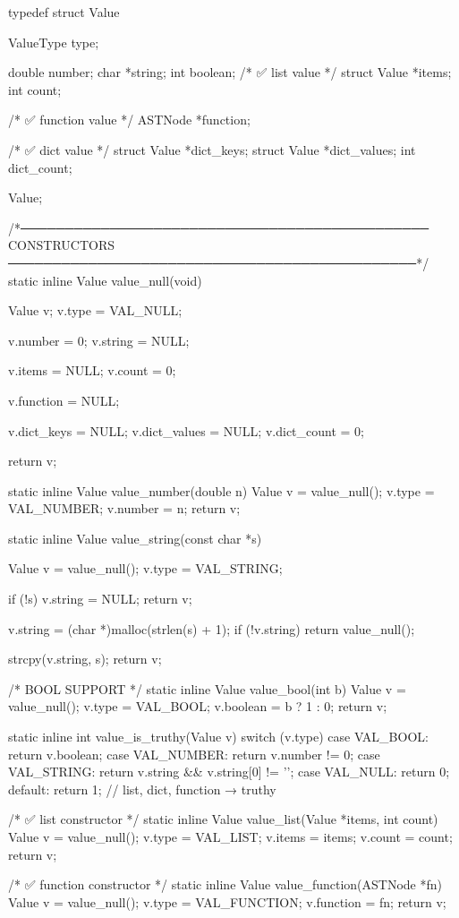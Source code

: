 \documentclass{article}
\begin{document}
typedef struct Value {
    ValueType type;

    double number;
    char *string;
    int boolean;
    /* ✅ list value */
    struct Value *items;
    int count;

    /* ✅ function value */
    ASTNode *function;

    /* ✅ dict value */
    struct Value *dict_keys;
    struct Value *dict_values;
    int dict_count;

} Value;

/*──────────────────────────────────────────────
  CONSTRUCTORS
──────────────────────────────────────────────*/
static inline Value value_null(void)
{
    Value v;
    v.type = VAL_NULL;

    v.number = 0;
    v.string = NULL;

    v.items = NULL;
    v.count = 0;

    v.function = NULL;

    v.dict_keys = NULL;
    v.dict_values = NULL;
    v.dict_count = 0;

    return v;
}

static inline Value value_number(double n)
{
    Value v = value_null();
    v.type = VAL_NUMBER;
    v.number = n;
    return v;
}

static inline Value value_string(const char *s)
{
    Value v = value_null();
    v.type = VAL_STRING;

    if (!s) {
        v.string = NULL;
        return v;
    }

    v.string = (char *)malloc(strlen(s) + 1);
    if (!v.string) return value_null();

    strcpy(v.string, s);
    return v;
}

/* BOOL SUPPORT */
static inline Value value_bool(int b)
{
    Value v = value_null();
    v.type = VAL_BOOL;
    v.boolean = b ? 1 : 0;
    return v;
}

static inline int value_is_truthy(Value v)
{
    switch (v.type) {
        case VAL_BOOL:   return v.boolean;
        case VAL_NUMBER: return v.number != 0;
        case VAL_STRING: return v.string && v.string[0] != '\0';
        case VAL_NULL:   return 0;
        default:         return 1;  // list, dict, function → truthy
    }
}


/* ✅ list constructor */
static inline Value value_list(Value *items, int count)
{
    Value v = value_null();
    v.type = VAL_LIST;
    v.items = items;
    v.count = count;
    return v;
}

/* ✅ function constructor */
static inline Value value_function(ASTNode *fn)
{
    Value v = value_null();
    v.type = VAL_FUNCTION;
    v.function = fn;
    return v;
}
\end{document}

